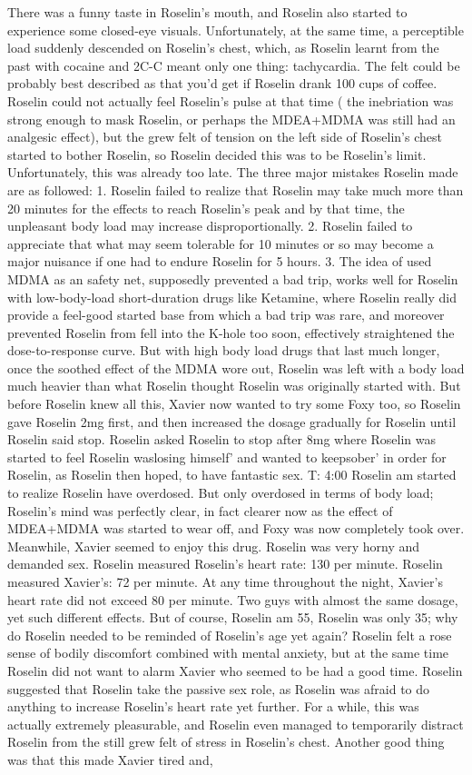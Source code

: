 \documentclass[12pt]{book}
\begin{document}
There was a funny taste in Roselin's mouth, and Roselin also started to experience some closed-eye visuals. Unfortunately, at the same time, a perceptible load suddenly descended on Roselin's chest, which, as Roselin learnt from the past with cocaine and 2C-C meant only one thing: tachycardia. The felt could be probably best described as that you'd get if Roselin drank 100 cups of coffee. Roselin could not actually feel Roselin's pulse at that time ( the inebriation was strong enough to mask Roselin, or perhaps the MDEA+MDMA was still had an analgesic effect), but the grew felt of tension on the left side of Roselin's chest started to bother Roselin, so Roselin decided this was to be Roselin's limit. Unfortunately, this was already too late. The three major mistakes Roselin made are as followed: 1. Roselin failed to realize that Roselin may take much more than 20 minutes for the effects to reach Roselin's peak and by that time, the unpleasant body load may increase disproportionally. 2. Roselin failed to appreciate that what may seem tolerable for 10 minutes or so may become a major nuisance if one had to endure Roselin for 5 hours. 3. The idea of used MDMA as an safety net, supposedly prevented a bad trip, works well for Roselin with low-body-load short-duration drugs like Ketamine, where Roselin really did provide a feel-good started base from which a bad trip was rare, and moreover prevented Roselin from fell into the K-hole too soon, effectively straightened the dose-to-response curve. But with high body load drugs that last much longer, once the soothed effect of the MDMA wore out, Roselin was left with a body load much heavier than what Roselin thought Roselin was originally started with. But before Roselin knew all this, Xavier now wanted to try some Foxy too, so Roselin gave Roselin 2mg first, and then increased the dosage gradually for Roselin until Roselin said stop. Roselin asked Roselin to stop after 8mg where Roselin was started to feel Roselin waslosing himself' and wanted to keepsober' in order for Roselin, as Roselin then hoped, to have fantastic sex. T: 4:00 Roselin am started to realize Roselin have overdosed. But only overdosed in terms of body load; Roselin's mind was perfectly clear, in fact clearer now as the effect of MDEA+MDMA was started to wear off, and Foxy was now completely took over. Meanwhile, Xavier seemed to enjoy this drug. Roselin was very horny and demanded sex. Roselin measured Roselin's heart rate: 130 per minute. Roselin measured Xavier's: 72 per minute. At any time throughout the night, Xavier's heart rate did not exceed 80 per minute. Two guys with almost the same dosage, yet such different effects. But of course, Roselin am 55, Roselin was only 35; why do Roselin needed to be reminded of Roselin's age yet again? Roselin felt a rose sense of bodily discomfort combined with mental anxiety, but at the same time Roselin did not want to alarm Xavier who seemed to be had a good time. Roselin suggested that Roselin take the passive sex role, as Roselin was afraid to do anything to increase Roselin's heart rate yet further. For a while, this was actually extremely pleasurable, and Roselin even managed to temporarily distract Roselin from the still grew felt of stress in Roselin's chest. Another good thing was that this made Xavier tired and, 
\end{document}
